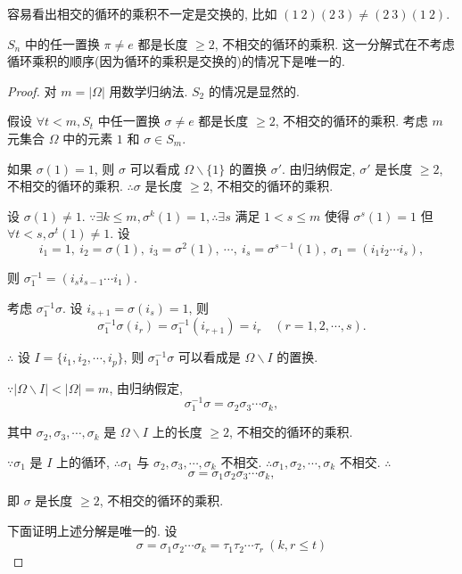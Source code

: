 \documentclass[color=black,device=normal,lang=cn,mode=geye]{elegantnote}
\begin{document}
容易看出相交的循环的乘积不一定是交换的, 比如 $(1\ 2)(2\ 3)\neq(2\ 3)(1\ 2)$.
\begin{theorem}[书上的定理1]
    $S_n$ 中的任一置换 $\pi\neq e$ 都是长度 $\geq2$, 不相交的循环的乘积. 这一分解式在不考虑循环乘积的顺序(因为循环的乘积是交换的)的情况下是唯一的. 
\end{theorem}
\begin{proof}
    对 $m=|\Omega|$ 用数学归纳法. $S_2$ 的情况是显然的.

    假设 $\forall t<m,S_{t}$ 中任一置换 $\sigma\neq e$ 都是长度 $\geq2$, 不相交的循环的乘积. 考虑 $m$ 元集合 $\Omega$ 中的元素 $1$ 和 $\sigma\in S_m$.

    如果 $\sigma(1)=1$, 则 $\sigma$ 可以看成 $\Omega\backslash\{1\}$ 的置换 $\sigma'$. 由归纳假定, $\sigma'$ 是长度 $\geq2$, 不相交的循环的乘积. $\therefore\sigma$ 是长度 $\geq2$, 不相交的循环的乘积.

    设 $\sigma(1)\neq1$. $\because\exists k\leq m,\sigma^k(1)=1,\therefore\exists s$ 满足 $1<s\leq m$ 使得 $\sigma^s(1)=1$ 但 $\forall t<s,\sigma^t(1)\neq1$. 设
    \[i_1=1,\ i_2=\sigma(1),\ i_3=\sigma^2(1),\ \cdots,\ i_s=\sigma^{s-1}(1),\ \sigma_1=(i_1i_2\cdots i_s),\]
    
    则 $\sigma^{-1}_1=(i_si_{s-1}\cdots i_1)$.

    考虑 $\sigma_1^{-1}\sigma$. 设 $i_{s+1}=\sigma(i_s)=1$, 则
    \[\sigma_1^{-1}\sigma(i_r)=\sigma_1^{-1}(i_{r+1})=i_r\quad(r=1,2,\cdots,s).\]

    $\therefore$ 设 $I=\{i_1,i_2,\cdots,i_p\}$, 则 $\sigma_1^{-1}\sigma$ 可以看成是 $\Omega\backslash I$ 的置换.

    $\because|\Omega\backslash I|<|\Omega|=m$, 由归纳假定,
    \[\sigma_1^{-1}\sigma=\sigma_2\sigma_3\cdots\sigma_k,\]

    其中 $\sigma_2,\sigma_3,\cdots,\sigma_k$ 是 $\Omega\backslash I$ 上的长度 $\geq2$, 不相交的循环的乘积.

    $\because\sigma_1$ 是 $I$ 上的循环, $\therefore\sigma_1$ 与 $\sigma_2,\sigma_3,\cdots,\sigma_k$ 不相交. $\therefore\sigma_1,\sigma_2,\cdots,\sigma_k$ 不相交. $\therefore$
    \[\sigma=\sigma_1\sigma_2\sigma_3\cdots\sigma_k,\]

    即 $\sigma$ 是长度 $\geq2$, 不相交的循环的乘积.

    下面证明上述分解是唯一的. 设
    \begin{equation}\label{eq1.1}
        \sigma=\sigma_1\sigma_2\cdots\sigma_k=\tau_1\tau_2\cdots\tau_r\ (k,r\leq t)
    \end{equation}


\end{proof}
\end{document}
